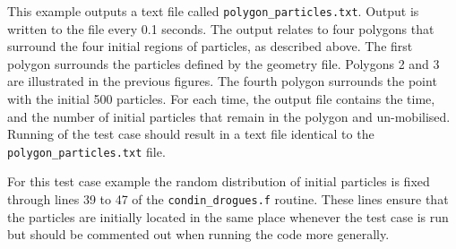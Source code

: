 \smallskip
This example outputs a text file called \verb!polygon_particles.txt!.  Output is written to the file every 0.1 seconds.  The output relates to four polygons that surround the four initial regions of particles, as described above.  The first polygon surrounds the particles defined by the geometry file.  Polygons 2 and 3 are illustrated in the previous figures.  The fourth polygon surrounds the point with the initial 500 particles.  For each time, the output file contains the time, and the number of initial particles that remain in the polygon and un-mobilised.    
Running of the test case should result in a text file identical to the \verb!polygon_particles.txt! file.

\smallskip
For this test case example the random distribution of initial particles is fixed through lines 39 to 47 of the \verb!condin_drogues.f! routine.  These lines ensure that the particles are initially located in the same place whenever the test case is run but should be commented out when running the code more generally.  

